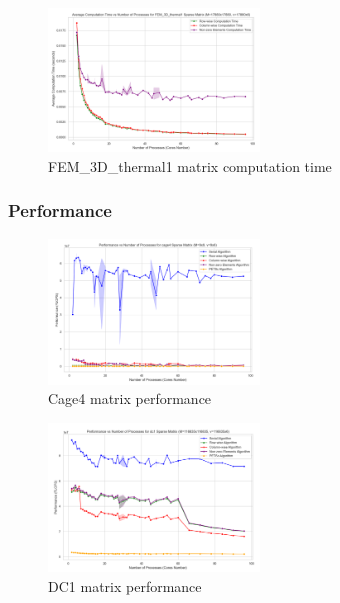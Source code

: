 \documentclass[12pt,oneside]{book} %
\begin{document}
\begin{figure}[H]
    \centering
    \includegraphics[width=0.5\textwidth]{../results/matrix_dim/FEM_3D_thermal1_k6_computation_time.png}
    \caption{FEM\_3D\_thermal1 matrix computation time}\label{fig:fem-3d-thermal1-k6-computation-time}
\end{figure}

\subsubsection{Performance}

\begin{figure}[H]
    \centering
    \includegraphics[width=0.5\textwidth]{../results/matrix_dim/cage4_k6_performance.png}
    \caption{Cage4 matrix performance}\label{fig:cage4-k6-performance}
\end{figure}

\begin{figure}[H]
    \centering
    \includegraphics[width=0.5\textwidth]{../results/matrix_dim/dc1_k6_performance.png}
    \caption{DC1 matrix performance}\label{fig:dc1-k6-performance}
\end{figure}
\end{document}
